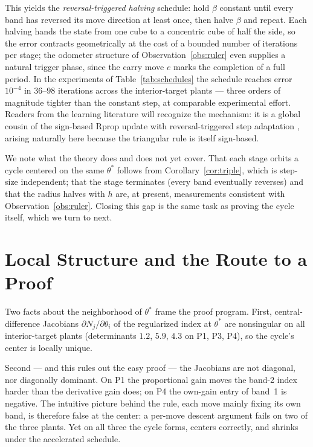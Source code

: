 \documentclass[letterpaper, 10pt, conference, twocolumn]{ieeeconf}
\begin{document}
This yields the \emph{reversal-triggered halving} schedule: hold $\beta$
constant until every band has reversed its move direction at least once, then
halve $\beta$ and repeat. Each halving hands the state from one cube to a
concentric cube of half the side, so the error contracts geometrically at the
cost of a bounded number of iterations per stage; the odometer structure of
Observation~\ref{obs:ruler} even supplies a natural trigger phase, since the
carry move $e$ marks the completion of a full period. In the experiments of
Table~\ref{tab:schedules} the schedule reaches error $10^{-4}$ in $36$--$98$
iterations across the interior-target plants --- three orders of magnitude
tighter than the constant step, at comparable experimental effort. Readers
from the learning literature will recognize the mechanism: it is a global
cousin of the sign-based Rprop update with reversal-triggered step adaptation
\cite{Riedmiller1993}, arising naturally here because the triangular rule is
itself sign-based.

We note what the theory does and does not yet cover. That each stage orbits a
cycle centered on the same $\theta^*$ follows from
Corollary~\ref{cor:triple}, which is step-size independent; that the stage
terminates (every band eventually reverses) and that the radius halves with
$h$ are, at present, measurements consistent with
Observation~\ref{obs:ruler}. Closing this gap is the same task as proving the
cycle itself, which we turn to next.

\section{Local Structure and the Route to a Proof}
\label{sec:structure}

Two facts about the neighborhood of $\theta^*$ frame the proof program.
First, central-difference Jacobians $\partial N_j / \partial \theta_i$ of the
regularized index at $\theta^*$ are nonsingular on all interior-target plants
(determinants $1.2$, $5.9$, $4.3$ on P1, P3, P4), so the cycle's center is
locally unique.

Second --- and this rules out the easy proof --- the Jacobians are not
diagonal, nor diagonally dominant. On P1 the proportional gain moves the
band-2 index harder than the derivative gain does; on P4 the own-gain entry of
band~1 is negative. The intuitive picture behind the rule, each move mainly
fixing its own band, is therefore false at the center: a per-move descent
argument fails on two of the three plants. Yet on all three the cycle forms,
centers correctly, and shrinks under the accelerated schedule.
\end{document}

